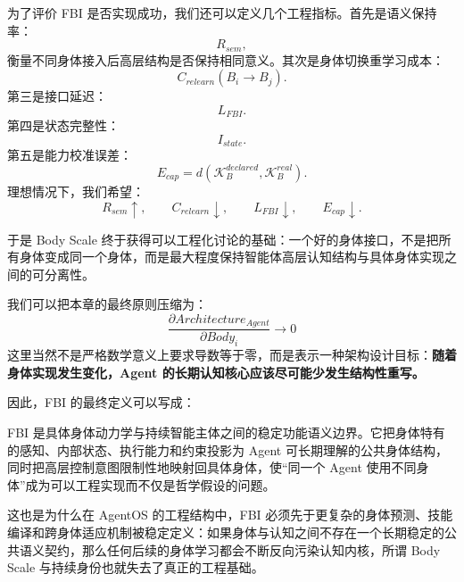为了评价 FBI 是否实现成功，我们还可以定义几个工程指标。首先是语义保持率：
\[
R_{sem},
\]
衡量不同身体接入后高层结构是否保持相同意义。其次是身体切换重学习成本：
\[
C_{relearn}(B_i\rightarrow B_j).
\]
第三是接口延迟：
\[
L_{FBI}.
\]
第四是状态完整性：
\[
I_{state}.
\]
第五是能力校准误差：
\[
E_{cap}
=
d(
\mathcal K_B^{declared},
\mathcal K_B^{real}
).
\]
理想情况下，我们希望：
\[
R_{sem}\uparrow,
\qquad
C_{relearn}\downarrow,
\qquad
L_{FBI}\downarrow,
\qquad
E_{cap}\downarrow.
\]

于是 Body Scale 终于获得可以工程化讨论的基础：一个好的身体接口，不是把所有身体变成同一个身体，而是最大程度保持智能体高层认知结构与具体身体实现之间的可分离性。

我们可以把本章的最终原则压缩为：
\[
\boxed{
\frac{\partial Architecture_{Agent}}
{\partial Body_i}
\rightarrow 0
}
\]
这里当然不是严格数学意义上要求导数等于零，而是表示一种架构设计目标：\textbf{随着身体实现发生变化，Agent 的长期认知核心应该尽可能少发生结构性重写。}

因此，FBI 的最终定义可以写成：

\begin{definition*}
FBI 是具体身体动力学与持续智能主体之间的稳定功能语义边界。它把身体特有的感知、内部状态、执行能力和约束投影为 Agent 可长期理解的公共身体结构，同时把高层控制意图限制性地映射回具体身体，使“同一个 Agent 使用不同身体”成为可以工程实现而不仅是哲学假设的问题。
\end{definition*}

这也是为什么在 AgentOS 的工程结构中，FBI 必须先于更复杂的身体预测、技能编译和跨身体适应机制被稳定定义：如果身体与认知之间不存在一个长期稳定的公共语义契约，那么任何后续的身体学习都会不断反向污染认知内核，所谓 Body Scale 与持续身份也就失去了真正的工程基础。
